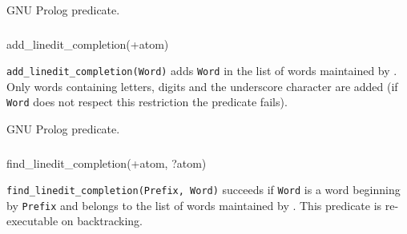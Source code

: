 \Portability

GNU Prolog predicate.

\subsubsection{}

\begin{TemplatesOneCol}
add\_linedit\_completion(+atom)

\end{TemplatesOneCol}

\Description

\texttt{add\_linedit\_completion(Word)} adds \texttt{Word} in the list of
 words maintained by 
. Only words containing letters, digits and
the underscore character are added (if \texttt{Word} does not respect
this restriction the predicate fails).

\begin{PlErrors}



\end{PlErrors}

\Portability

GNU Prolog predicate.

\subsubsection{}

\begin{TemplatesOneCol}
find\_linedit\_completion(+atom, ?atom)

\end{TemplatesOneCol}

\Description

\texttt{find\_linedit\_completion(Prefix, Word)} succeeds if \texttt{Word}
is a word beginning by \texttt{Prefix} and belongs to the list of
 words maintained by 
. This predicate is re-executable on backtracking.

\begin{PlErrors}




\end{PlErrors}

